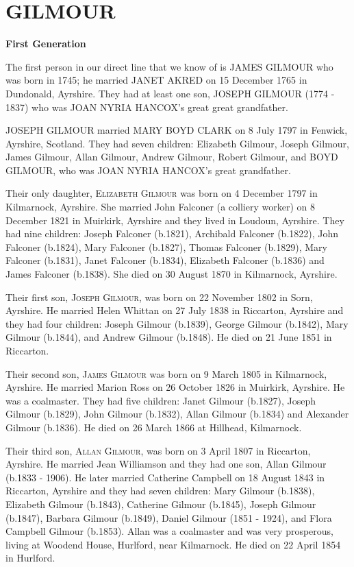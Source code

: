 \section{GILMOUR}

\textbf{First Generation}

The first person in our direct line that we know of is \uppercase{James Gilmour} who was born in 1745;  he married \uppercase{Janet Akred} on 15 December 1765 in Dundonald, Ayrshire. They had at least one son, \uppercase{Joseph Gilmour} (1774 - 1837) who was \uppercase{Joan Nyria Hancox}'s great great grandfather.

\uppercase{Joseph Gilmour} married \uppercase{Mary Boyd Clark} on 8 July 1797 in Fenwick, Ayrshire, Scotland. They had seven children: Elizabeth Gilmour, Joseph Gilmour, James Gilmour, Allan Gilmour, Andrew Gilmour, Robert Gilmour, and \uppercase{Boyd Gilmour}, who was \uppercase{Joan Nyria Hancox}'s great grandfather.

Their only daughter, \textsc{Elizabeth Gilmour} was born on 4 December 1797 in Kilmarnock, Ayrshire. She married John Falconer (a colliery worker) on 8 December 1821 in Muirkirk, Ayrshire and they lived in Loudoun, Ayrshire. They had nine children: Joseph Falconer (b.1821), Archibald Falconer (b.1822), John Falconer (b.1824), Mary Falconer (b.1827), Thomas Falconer (b.1829), Mary Falconer (b.1831), Janet Falconer (b.1834), Elizabeth Falconer (b.1836) and James Falconer (b.1838).  She died on 30 August 1870 in Kilmarnock, Ayrshire.

Their first son, \textsc{Joseph Gilmour}, was born on 22 November 1802 in Sorn,	Ayrshire.  He married Helen Whittan on 27 July 1838 in Riccarton, Ayrshire and they had four children: Joseph Gilmour (b.1839),  George Gilmour (b.1842), Mary Gilmour (b.1844), and Andrew Gilmour (b.1848). He died on	21 June 1851 in Riccarton.	

Their second son, \textsc{James Gilmour} was born on 9 March 1805 in Kilmarnock, Ayrshire. He married Marion Ross on 26 October 1826 in Muirkirk, Ayrshire. He was a coalmaster. They had five children: Janet Gilmour (b.1827), Joseph Gilmour (b.1829), John Gilmour (b.1832), Allan Gilmour (b.1834) and Alexander Gilmour (b.1836). He died on 26 March 1866 at Hillhead, Kilmarnock.

Their third son, \textsc{Allan Gilmour}, was born on 3 April 1807 in Riccarton, Ayrshire. He married Jean Williamson and they had one son, Allan Gilmour (b.1833 - 1906).  He later married Catherine Campbell on 18 August 1843 in Riccarton, Ayrshire and they had seven children: Mary Gilmour (b.1838), Elizabeth Gilmour (b.1843), Catherine Gilmour (b.1845), Joseph Gilmour (b.1847), Barbara Gilmour (b.1849), Daniel Gilmour (1851 - 1924), and Flora Campbell Gilmour (b.1853).  Allan was a coalmaster and was very prosperous, living at Woodend House, Hurlford, near Kilmarnock.  He died on 22 April 1854 in Hurlford.

